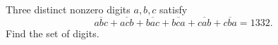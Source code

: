 Three distinct nonzero digits $a,b,c$ satisfy
\[\overline{abc}+\overline{acb}+\overline{bac}+\overline{bca}+\overline{cab}+\overline{cba}=1332.\]
Find the set of digits.
